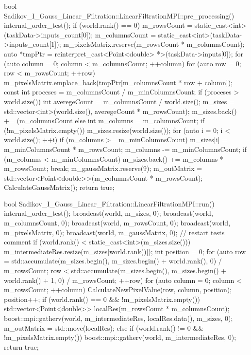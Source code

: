 \documentclass[a4paper,14pt]{report}
\begin{document}
\begin{lstlistings}
bool Sadikov_I_Gauss_Linear_Filtration::LinearFiltrationMPI::pre_processing() {
  internal_order_test();
  if (world.rank() == 0) {
    m_rowsCount = static_cast<int>(taskData->inputs_count[0]);
    m_columnsCount = static_cast<int>(taskData->inputs_count[1]);
    m_pixelsMatrix.reserve(m_rowsCount * m_columnsCount);
    auto *tmpPtr = reinterpret_cast<Point<double> *>(taskData->inputs[0]);
    for (auto column = 0; column < m_columnsCount; ++column) {
      for (auto row = 0; row < m_rowsCount; ++row) {
        m_pixelsMatrix.emplace_back(tmpPtr[m_columnsCount * row + column]);
      }
    }
    const int proceses = m_columnsCount / m_minColumnsCount;
    if (proceses > world.size()) {
      int averegeCount = m_columnsCount / world.size();
      m_sizes = std::vector<int>(world.size(), averegeCount * m_rowsCount);
      m_sizes.back() += (m_columnsCount %
    } else {
      int m_columns = m_columnsCount;
      if (!m_pixelsMatrix.empty()) {
        m_sizes.resize(world.size());
      }
      for (auto i = 0; i < world.size(); ++i) {
        if (m_columns >= m_minColumnsCount) {
          m_sizes[i] = m_minColumnsCount * m_rowsCount;
          m_columns -= m_minColumnsCount;
          if (m_columns < m_minColumnsCount) {
            m_sizes.back() += m_columns * m_rowsCount;
            break;
          }
        }
      }
    }
    m_gaussMatrix.reserve(9);
    m_outMatrix = std::vector<Point<double>>(m_columnsCount * m_rowsCount);
    CalculateGaussMatrix();
  }
  return true;
}

bool Sadikov_I_Gauss_Linear_Filtration::LinearFiltrationMPI::run() {
  internal_order_test();
  broadcast(world, m_sizes, 0);
  broadcast(world, m_columnsCount, 0);
  broadcast(world, m_rowsCount, 0);
  broadcast(world, m_pixelsMatrix, 0);
  broadcast(world, m_gaussMatrix, 0);
  // restart tests comment
  if (world.rank() < static_cast<int>(m_sizes.size())) {
    m_intermediateRes.resize(m_sizes[world.rank()]);
    int position = 0;
    for (auto row = std::accumulate(m_sizes.begin(), m_sizes.begin() + world.rank(), 0) / m_rowsCount;
         row < std::accumulate(m_sizes.begin(), m_sizes.begin() + world.rank() + 1, 0) / m_rowsCount; ++row) {
      for (auto column = 0; column < m_rowsCount; ++column) {
        CalculateNewPixelValue(row, column, position);
        position++;
      }
    }
  }
  if (world.rank() == 0 && !m_pixelsMatrix.empty()) {
    std::vector<Point<double>> localRes(m_rowsCount * m_columnsCount);
    boost::mpi::gatherv(world, m_intermediateRes, localRes.data(), m_sizes, 0);
    m_outMatrix = std::move(localRes);
  } else if (world.rank() != 0 && !m_pixelsMatrix.empty()) {
    boost::mpi::gatherv(world, m_intermediateRes, 0);
  }
  return true;
}


\end{lstlistings}
\end{document}
